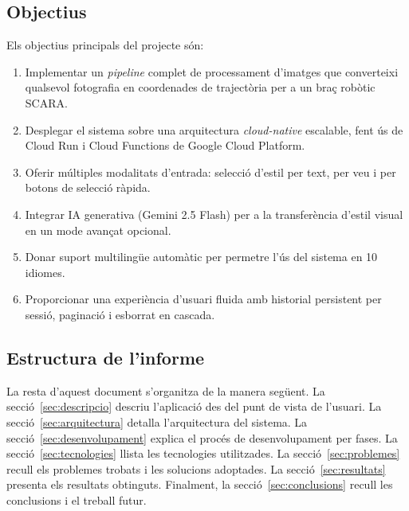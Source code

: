 \subsection{Objectius}

Els objectius principals del projecte són:

\begin{enumerate}
  \item Implementar un \textit{pipeline} complet de processament d'imatges que converteixi qualsevol fotografia en coordenades de trajectòria per a un braç robòtic SCARA.
  \item Desplegar el sistema sobre una arquitectura \textit{cloud-native} escalable, fent ús de Cloud Run i Cloud Functions de Google Cloud Platform.
  \item Oferir múltiples modalitats d'entrada: selecció d'estil per text, per veu i per botons de selecció ràpida.
  \item Integrar IA generativa (Gemini 2.5 Flash) per a la transferència d'estil visual en un mode avançat opcional.
  \item Donar suport multilingüe automàtic per permetre l'ús del sistema en 10 idiomes.
  \item Proporcionar una experiència d'usuari fluida amb historial persistent per sessió, paginació i esborrat en cascada.
\end{enumerate}

\subsection{Estructura de l'informe}

La resta d'aquest document s'organitza de la manera següent. La secció~\ref{sec:descripcio} descriu l'aplicació des del punt de vista de l'usuari. La secció~\ref{sec:arquitectura} detalla l'arquitectura del sistema. La secció~\ref{sec:desenvolupament} explica el procés de desenvolupament per fases. La secció~\ref{sec:tecnologies} llista les tecnologies utilitzades. La secció~\ref{sec:problemes} recull els problemes trobats i les solucions adoptades. La secció~\ref{sec:resultats} presenta els resultats obtinguts. Finalment, la secció~\ref{sec:conclusions} recull les conclusions i el treball futur.
